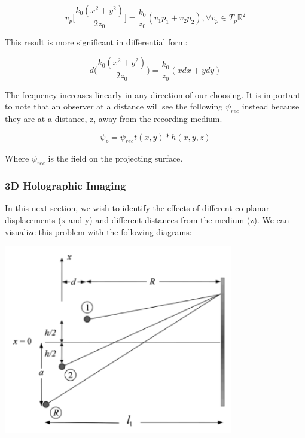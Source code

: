 \documentclass[12pt]{article}
\begin{document}
\begin{equation}
	v_{p}\bigg[ \frac{k_{0}(x^2 + y^2)}{2z_{0}} \bigg] = \frac{k_{0}}{z_{0}}(v_{1}p_{1} + v_{2}p_{2}), \forall v_{p} \in T_{p} \mathbb{R}^2
\end{equation}

This result is more significant in differential form:

\begin{equation}
	d \bigg( \frac{k_{0}(x^2 + y^2)}{2z_{0}} \bigg) = \frac{k_{0}}{z_{0}}(xdx + ydy)
\end{equation}

The frequency increases linearly in any direction of our choosing.
It is important to note that an observer at a distance will see the following 
\(\psi_{rec}\) instead because they are at a distance, z, away from the
recording medium.

\begin{equation}
	\psi_{p} = \psi_{rec}t(x,y)*h(x,y,z)
\end{equation}

Where \(\psi_{rec}\) is the field on the projecting surface.

\subsubsection{3D Holographic Imaging}

In this next section, we wish to identify the effects of different co-planar displacements 
(x and y) and different distances from the medium (z). We can visualize this problem with the following diagrams:

\begin{center}
\includegraphics[width=100mm]{tupac11.png}
\end{center}
\end{document}
